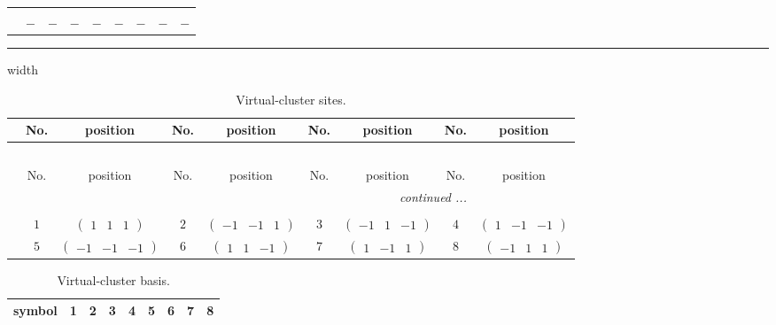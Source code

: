 \documentclass[fleqn,10pt,landscape]{article}
\begin{document}
\begin{itemize}
\begin{center}
\begin{longtable}{ccccccccc}
 \hline \hline
\multicolumn{8}{r}{} \\ \endlastfoot

$  $ & $ - $ & $ - $ & $ - $ & $ - $ & $ - $ & $ - $ & $ - $ & $ - $ \\
\end{longtable}
\end{center}

 \hfil \hrule height 1mm width \textwidth \hfil

{
\scriptsize
\begin{center}
\renewcommand{\arraystretch}{1.7}
\begin{longtable}{ccccccccc}
\caption{Virtual-cluster sites.}
 \\
 \hline \hline
 & No. & position & No. & position & No. & position & No. & position \\ \hline \endfirsthead

\multicolumn{8}{l}{\tablename\ \thetable{}} \\
 \hline \hline
 & No. & position & No. & position & No. & position & No. & position \\ \hline \endhead

 \hline \hline
\multicolumn{8}{r}{\footnotesize\it continued ...} \\ \endfoot

 \hline \hline
\multicolumn{8}{r}{} \\ \endlastfoot

 & $ 1 $ & $ \begin{pmatrix} 1 & 1 & 1 \end{pmatrix} $ & $ 2 $ & $ \begin{pmatrix} -1 & -1 & 1 \end{pmatrix} $ & $ 3 $ & $ \begin{pmatrix} -1 & 1 & -1 \end{pmatrix} $ & $ 4 $ & $ \begin{pmatrix} 1 & -1 & -1 \end{pmatrix} $ \\
& $ 5 $ & $ \begin{pmatrix} -1 & -1 & -1 \end{pmatrix} $ & $ 6 $ & $ \begin{pmatrix} 1 & 1 & -1 \end{pmatrix} $ & $ 7 $ & $ \begin{pmatrix} 1 & -1 & 1 \end{pmatrix} $ & $ 8 $ & $ \begin{pmatrix} -1 & 1 & 1 \end{pmatrix} $ \\
\end{longtable}
\end{center}
\begin{center}
\renewcommand{\arraystretch}{1.7}
\begin{longtable}{ccccccccc}
\caption{Virtual-cluster basis.}
 \\
 \hline \hline
symbol & 1 & 2 & 3 & 4 & 5 & 6 & 7 & 8 \\ \hline \endfirsthead


\end{longtable}
\end{center}}
\end{itemize}
\end{document}
